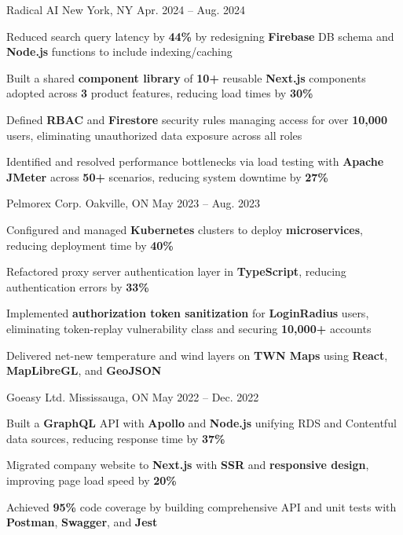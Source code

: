 \documentclass[11pt, a4paper]{awesome-cv}
\begin{document}
\begin{cventries}
  \cventry
    {\color{lightblue}{SOFTWARE ENGINEER INTERN}}
    {Radical AI}
    {New York, NY}
    {Apr. 2024 -- Aug. 2024}
    {
      \begin{cvitems}
        \item{Reduced search query latency by \textbf{44\%} by redesigning \textbf{Firebase} DB schema and \textbf{Node.js} functions to include indexing/caching}
        \item{Built a shared \textbf{component library} of \textbf{10+} reusable \textbf{Next.js} components adopted across \textbf{3} product features, reducing load times by \textbf{30\%}}
        \item{Defined \textbf{RBAC} and \textbf{Firestore} security rules managing access for over \textbf{10,000} users, eliminating unauthorized data exposure across all roles}
        \item{Identified and resolved performance bottlenecks via load testing with \textbf{Apache JMeter} across \textbf{50+} scenarios, reducing system downtime by \textbf{27\%}}
      \end{cvitems}
    }

  \vspace{3mm}

  \cventry
    {\color{lightblue}{SOFTWARE ENGINEER INTERN}}
    {Pelmorex Corp.}
    {Oakville, ON}
    {May 2023 -- Aug. 2023}
    {
      \begin{cvitems}
        \item{Configured and managed \textbf{Kubernetes} clusters to deploy \textbf{microservices}, reducing deployment time by \textbf{40\%}}
        \item{Refactored proxy server authentication layer in \textbf{TypeScript}, reducing authentication errors by \textbf{33\%}}
        \item{Implemented \textbf{authorization token sanitization} for \textbf{LoginRadius} users, eliminating token-replay vulnerability class and securing \textbf{10,000+} accounts}
        \item{Delivered net-new temperature and wind layers on \textbf{TWN Maps} using \textbf{React}, \textbf{MapLibreGL}, and \textbf{GeoJSON}}
      \end{cvitems}
    }

  \vspace{3mm}

  \cventry
    {\color{lightblue}{FRONT-END DEVELOPER INTERN}}
    {Goeasy Ltd.}
    {Mississauga, ON}
    {May 2022 -- Dec. 2022}
    {
      \begin{cvitems}
        \item{Built a \textbf{GraphQL} API with \textbf{Apollo} and \textbf{Node.js} unifying RDS and Contentful data sources, reducing response time by \textbf{37\%}}
        \item{Migrated company website to \textbf{Next.js} with \textbf{SSR} and \textbf{responsive design}, improving page load speed by \textbf{20\%}}
        \item{Achieved \textbf{95\%} code coverage by building comprehensive API and unit tests with \textbf{Postman}, \textbf{Swagger}, and \textbf{Jest}}
      \end{cvitems}
    }


\end{cventries}
\end{document}
